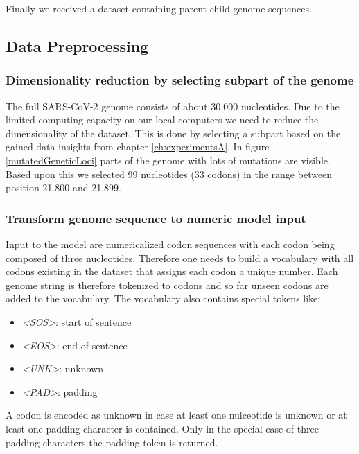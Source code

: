 Finally we received a dataset containing parent-child genome sequences.

\subsection{Data Preprocessing}  \label{ch:approachB}

\subsubsection{Dimensionality reduction by selecting subpart of the genome}
\label{ch:approachBa}

The full \ac{SARS-CoV-2} genome consists of about 30.000 nucleotides. Due to the limited computing capacity on our local computers we need to reduce the dimensionality of the dataset. This is done by selecting a subpart based on the gained data insights from chapter \ref{ch:experimentsA}. In figure \ref{mutatedGeneticLoci} parts of the genome with lots of mutations are visible. Based upon this we selected 99 nucleotides (33 codons) in the range between position 21.800 and 21.899.

\subsubsection{Transform genome sequence to numeric model input}
\label{ch:approachBb}

Input to the model are numericalized codon sequences with each codon being composed of three nucleotides. Therefore one needs to build a vocabulary with all codons existing in the dataset that assigns each codon a unique number. Each genome string is therefore tokenized to codons and so far unseen codons are added to the vocabulary. The vocabulary also contains special tokens like:

\begin{itemize}
	\item \textit{<SOS>}: start of sentence
	\item \textit{<EOS>}: end of sentence
	\item \textit{<UNK>}: unknown
	\item \textit{<PAD>}: padding
\end{itemize}

A codon is encoded as unknown in case at least one nulceotide is unknown or at least one padding character is contained. Only in the special case of three padding characters the padding token is returned. 

